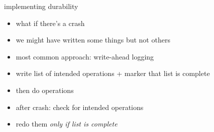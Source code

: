 \begin{frame}{implementing durability}
    \begin{itemize}
    \item what if there's a crash
    \item we might have written some things but not others
    \item most common approach: write-ahead logging
    \vspace{.5cm}
    \item write list of intended operations + marker that list is complete
    \item then do operations
    \vspace{.5cm}
    \item after crash: check for intended operations
    \item redo them \textit{only if list is complete}
    \end{itemize}
\end{frame}
